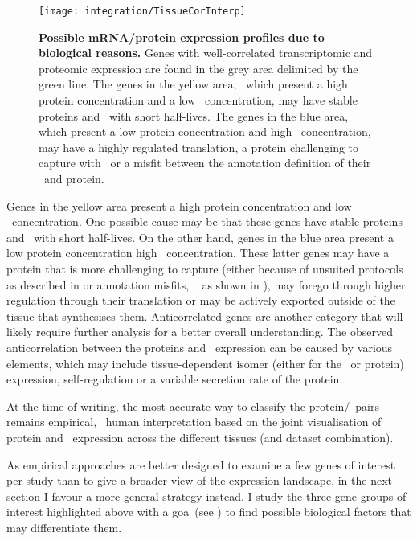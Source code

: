 \begin{figure}[!htb]
    \texttt{[image: integration/TissueCorInterp]}\centering
    \vspace{-3mm}
    \caption[Possible mRNA/protein expression profiles
    due to biological reasons.]{\label{fig:CorImprovable}%
    \textbf{Possible mRNA/protein expression profiles due to biological reasons.}
    Genes with well-correlated transcriptomic and proteomic expression
    are found in the grey area delimited by the green line.
    The genes in the yellow area,
    \ie\ which present a high protein concentration and a low \mRNA\ concentration,
    may have stable proteins and \mRNAs\ with short half-lives.
    The genes in the blue area,
    which present a low protein concentration and high \mRNA\ concentration,
    may have a highly regulated translation,
    a protein challenging to capture with \ms\,
    or a misfit between the annotation definition of their \mRNA\ and protein.
    }
\end{figure}

Genes in the yellow area present a high protein concentration
and low \mRNA\ concentration.
One possible cause may be that these genes have stable proteins
and \mRNAs\ with short half-lives.
On the other hand,
genes in the blue area present a low protein concentration
high \mRNA\ concentration.
These latter genes may have a protein that is more challenging to capture
(either because of unsuited protocols as described in 
or annotation misfits, \eg\  as shown in ),
may forego through higher regulation through their translation
or may be actively exported outside of the tissue that synthesises them.
Anticorrelated genes are another category that will likely require
further analysis for a better overall understanding.
The observed anticorrelation between the proteins and \mRNAs\ expression
can be caused by various elements, which may include
tissue-dependent isomer (either for the \mRNA\ or protein) expression,
self-regulation or a variable secretion rate of the protein.\mybr\

At the time of writing,
the most accurate way to classify the protein/\mRNA\ pairs
remains empirical,
\ie\ human interpretation based on
the joint visualisation of protein and \mRNA\ expression
across the different tissues (and dataset combination).\mybr\

As empirical approaches are better designed
to examine a few genes of interest per study
than to give a broader view of the expression landscape,
in the next section I favour a more general strategy instead.
I study the three gene groups of interest highlighted above
with a \glsdesc{goa}~(see )
to find possible biological factors that may differentiate them.\mybr\

